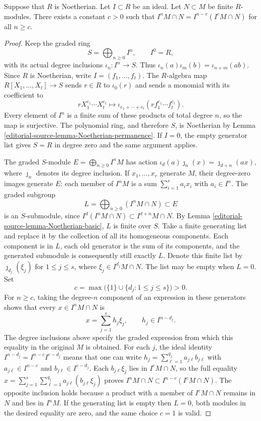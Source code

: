 \begin{lemma}
\label{editorial-source-lemma-Artin-Rees}
Suppose that $R$ is Noetherian. Let $I \subset R$ be an ideal.
Let $N \subset M$ be finite $R$-modules.
There exists a constant $c > 0$ such that
$I^n M \cap N  =  I^{n-c}(I^cM \cap N)$ for all $n \geq c$.
\end{lemma}

\begin{proof}
Keep the graded ring
$$
S=\bigoplus_{n\geq0}I^n,\qquad I^0=R,
$$
with its actual degree inclusions $\iota_n:I^n\to S$.
Thus $\iota_n(a)\iota_m(b)=\iota_{n+m}(ab)$.
Since $R$ is Noetherian, write $I=(f_1,\ldots,f_t)$.
The $R$-algebra map $R[X_1,\ldots,X_t]\to S$ sends $r\in R$
to $\iota_0(r)$ and sends a monomial with its coefficient to
$$
rX_1^{e_1}\cdots X_t^{e_t}
\longmapsto
\iota_{e_1+\cdots+e_t}
 (rf_1^{e_1}\cdots f_t^{e_t}).
$$
Every element of $I^n$ is a finite sum of these products of total
degree $n$, so the map is surjective. The polynomial ring, and
therefore $S$, is Noetherian by Lemma
\ref{editorial-source-lemma-Noetherian-permanence}. If $I=0$, the empty generator
list gives $S=R$ in degree zero and the same argument applies.

The graded $S$-module
$E=\bigoplus_{n\geq0}I^nM$ has action
$\iota_d(a)\jmath_n(x)=\jmath_{d+n}(ax)$, where $\jmath_n$
denotes its degree inclusion. If $x_1,\ldots,x_r$ generate
$M$, their degree-zero images generate $E$: each member of
$I^nM$ is a sum $\sum_{i=1}^r a_ix_i$ with $a_i\in I^n$.
The graded subgroup
$$
L=\bigoplus_{n\geq0}(I^nM\cap N)\subset E
$$
is an $S$-submodule, since
$I^d(I^nM\cap N)\subset I^{d+n}M\cap N$.
By Lemma \ref{editorial-source-lemma-Noetherian-basic}, $L$ is finite over $S$.
Take a finite generating list and replace it by the collection of
all its homogeneous components. Each component is in $L$, each
old generator is the sum of its components, and the generated
submodule is consequently still exactly $L$. Denote this finite
list by $\jmath_{d_j}(\xi_j)$ for $1\leq j\leq s$, where
$\xi_j\in I^{d_j}M\cap N$. The list may be empty when $L=0$.
Set
$$
c=\max\bigl(\{1\}\cup\{d_j:1\leq j\leq s\}\bigr)>0.
$$
For $n\geq c$, taking the degree-$n$ component of an expression
in these generators shows that every $x\in I^nM\cap N$ is
$$
x=\sum_{j=1}^s h_j\xi_j,\qquad h_j\in I^{n-d_j}.
$$
The degree inclusions above specify the graded expression from
which this equality in the original $M$ is obtained.
For each $j$, the ideal identity
$I^{n-d_j}=I^{n-c}I^{c-d_j}$ means that one can write
$h_j=\sum_{\ell=1}^{q_j}a_{j\ell}b_{j\ell}$ with
$a_{j\ell}\in I^{n-c}$ and $b_{j\ell}\in I^{c-d_j}$.
Each $b_{j\ell}\xi_j$ lies in $I^cM\cap N$, so the full
equality
$x=\sum_{j=1}^s\sum_{\ell=1}^{q_j}
a_{j\ell}(b_{j\ell}\xi_j)$ proves
$I^nM\cap N\subset I^{n-c}(I^cM\cap N)$.
The opposite inclusion holds because a product with a member of
$I^cM\cap N$ remains in $N$ and lies in $I^nM$.
If the generating list is empty then $L=0$, both modules in the
desired equality are zero, and the same choice $c=1$ is valid.


\end{proof}
